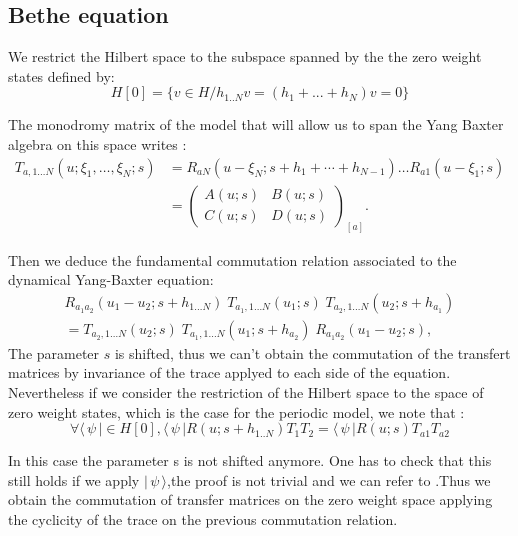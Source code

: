 \documentclass[12pt]{article}
\newcommand{\bra}[1]{\langle\,#1\,|}
\newcommand{\ket}[1]{|\,#1\,\rangle}
\begin{document}
\subsection{Bethe equation}

We restrict the Hilbert space to the subspace spanned by the the zero weight states defined by:
$$H[0]=\{ v \in H / h_{1..N}v=(h_1+...+h_N)v=0\}$$

The monodromy matrix of the model that will allow us to span the Yang Baxter algebra on this space writes :
\begin{align}\label{monodromy}
 T_{a, 1\ldots N}(u ; \xi_1,\ldots, \xi_N ; s)
  &= R_{a N} (u - \xi_N ; s + h_1 +\cdots + h_{N-1} ) \ldots    R_{a 1} (u - \xi_1 ; s  ) \nonumber\\
  &= \begin{pmatrix} A(u ; s) & B(u ; s) \\
                                    C(u ; s) & D(u ; s) \end{pmatrix}_{\!\! [a]}.   
\end{align}


Then we deduce the fundamental commutation relation associated to the dynamical Yang-Baxter equation:
\begin{multline}\label{RTT}
R_{a_1 a_2} (u_1-u_2 ; s + h_{1\ldots N}) \;
        T_{a_1, 1\ldots N}(u_1 ; s) \;  T_{a_2, 1\ldots N}(u_2 ; s+h_{a_1}) \\
= T_{a_2, 1\ldots N}(u_2 ; s)\;  T_{a_1, 1\ldots N}(u_1 ; s+h_{a_2}) \;
   R_{a_1 a_2} (u_1-u_2 ; s),
\end{multline}
The parameter $s$ is shifted, thus we can't obtain the commutation of the transfert matrices by invariance of the trace applyed to each side of the equation. Nevertheless if we consider the restriction of the Hilbert space to the space of zero weight states, which is the case for the periodic model, we note that : 
\begin{equation}
\forall \bra{\psi}\in H[0], \bra{\psi}R(u;s+h_{1..N})T_1 T_2=\bra{\psi}R(u;s)T_{a1} T_{a2}
\end{equation}
 
 In this case the parameter s is not shifted anymore. One has to check that this still holds if we apply $\ket{\psi}$,the proof is not trivial and we can refer to \cite{FelV96a}.Thus we obtain the commutation of transfer matrices on the zero weight space applying the cyclicity of the trace on the previous commutation relation.
\end{document}
